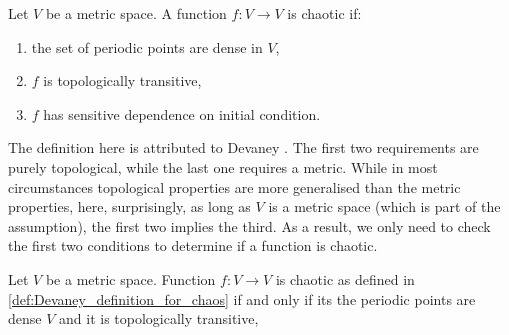 \begin{defn}\label{def:Devaney_definition_for_chaos}
	Let $V$ be a metric space.
	A function $f: V \rightarrow V$ is chaotic if: 
	\begin{enumerate}
		\item the set of periodic points are dense in $V$,
		\item $f$ is topologically transitive,
		\item $f$ has sensitive dependence on initial condition. 
	\end{enumerate}
	
\end{defn}


The definition here is attributed to Devaney \cite{Devaney_green_book_chaos_definition}. 
The first two requirements are purely topological, while the last one requires a metric. 
While in most circumstances topological properties are more generalised than the metric properties, here, surprisingly, as long as $V$ is a metric space (which is part of the assumption), the first two implies the third\cite{Banks}. 
As a result, we only need to check the first two conditions to determine if a function is chaotic.

\begin{thm}
	Let $V$ be a metric space. 
	Function $f: V \rightarrow V$ is chaotic as defined in \ref{def:Devaney_definition_for_chaos}
	if and only if its the periodic points are dense $V$ and it is topologically transitive,
\end{thm}


